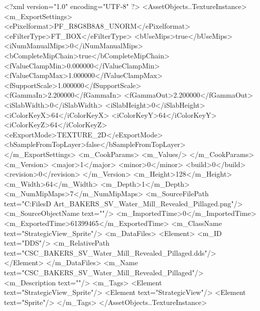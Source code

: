 <?xml version="1.0" encoding="UTF-8" ?>
<AssetObjects..TextureInstance>
	<m_ExportSettings>
		<ePixelformat>PF_R8G8B8A8_UNORM</ePixelformat>
		<eFilterType>FT_BOX</eFilterType>
		<bUseMips>true</bUseMips>
		<iNumManualMips>0</iNumManualMips>
		<bCompleteMipChain>true</bCompleteMipChain>
		<fValueClampMin>0.000000</fValueClampMin>
		<fValueClampMax>1.000000</fValueClampMax>
		<fSupportScale>1.000000</fSupportScale>
		<fGammaIn>2.200000</fGammaIn>
		<fGammaOut>2.200000</fGammaOut>
		<iSlabWidth>0</iSlabWidth>
		<iSlabHeight>0</iSlabHeight>
		<iColorKeyX>64</iColorKeyX>
		<iColorKeyY>64</iColorKeyY>
		<iColorKeyZ>64</iColorKeyZ>
		<eExportMode>TEXTURE_2D</eExportMode>
		<bSampleFromTopLayer>false</bSampleFromTopLayer>
	</m_ExportSettings>
	<m_CookParams>
		<m_Values/>
	</m_CookParams>
	<m_Version>
		<major>1</major>
		<minor>0</minor>
		<build>0</build>
		<revision>0</revision>
	</m_Version>
	<m_Height>128</m_Height>
	<m_Width>64</m_Width>
	<m_Depth>1</m_Depth>
	<m_NumMipMaps>7</m_NumMipMaps>
	<m_SourceFilePath text="C:\Users\Shadow\Desktop\Working Files\2D Art\Quarters\Bakers\StrategicView\CSC_BAKERS_SV_Water_Mill_Revealed_Pillaged.png"/>
	<m_SourceObjectName text=""/>
	<m_ImportedTime>0</m_ImportedTime>
	<m_ExportedTime>61399465</m_ExportedTime>
	<m_ClassName text="StrategicView_Sprite"/>
	<m_DataFiles>
		<Element>
			<m_ID text="DDS"/>
			<m_RelativePath text="CSC_BAKERS_SV_Water_Mill_Revealed_Pillaged.dds"/>
		</Element>
	</m_DataFiles>
	<m_Name text="CSC_BAKERS_SV_Water_Mill_Revealed_Pillaged"/>
	<m_Description text=""/>
	<m_Tags>
		<Element text="StrategicView_Sprite"/>
		<Element text="StrategicView"/>
		<Element text="Sprite"/>
	</m_Tags>
</AssetObjects..TextureInstance>


